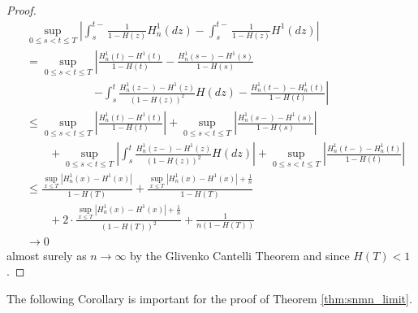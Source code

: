 \begin{lemma}
\begin{proof}
\begin{align*}
		&\sup\limits_{0\leq s<t\leq T}\left| \int_{s}^{t-} \frac{1}{1-H(z)} H^1_n(dz) - \int_{s}^{t-} \frac{1}{1-H(z)} H^1(dz)\right|\\
		&= \sup\limits_{0\leq s<t\leq T}\left| \frac{H^1_n(t) - H^1(t)}{1-H(t)} -  \frac{H^1_n(s-) - H^1(s)}{1-H(s)}\right.\\
		&\qquad\qquad\qquad \left. - \int_s^{t} \frac{H^1_n(z-) - H^1(z)}{(1-H(z))^2} H(dz) - \frac{H^1_n(t-) - H^1_n(t)}{1-H(t)}\right|\\
		&\leq \sup\limits_{0\leq s<t\leq T}\left| \frac{H^1_n(t) - H^1(t)}{1-H(t)}\right| + \sup\limits_{0\leq s<t\leq T}\left| \frac{H^1_n(s-) - H^1(s)}{1-H(s)}\right|\\
		&\qquad  + \sup\limits_{0\leq s<t\leq T}\left|\int_s^{t} \frac{H^1_n(z-) - H^1(z)}{(1-H(z))^2} H(dz)\right| + \sup\limits_{0\leq s<t\leq T}\left|\frac{H^1_n(t-) - H^1_n(t)}{1-H(t)}\right|\\
		&\leq \frac{\sup\limits_{x\leq T}\left| H^1_n(x) - H^1(x)\right|}{1-H(T)} + \frac{\sup\limits_{x\leq T}\left| H^1_n(x) - H^1(x)\right| + \frac{1}{n}}{1-H(T)}\\ 
		&\qquad + 2\cdot\frac{\sup\limits_{x\leq T}\left|H^1_n(x) - H^1(x)\right| + \frac{1}{n}}{(1-H(T))^2} + \frac{1}{n(1-H(T))}\\
		&\to 0
		\end{align*}
		almost surely as $n\to\infty$ by the Glivenko Cantelli Theorem and since $H(T)<1$.
	\end{proof}
\end{lemma}
%
The following Corollary is important for the proof of Theorem \ref{thm:snmn_limit}.
